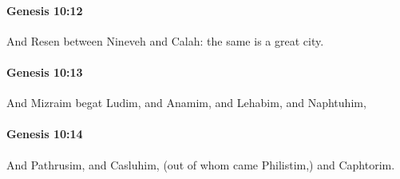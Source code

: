 		\paragraph{Genesis 10:12} %
			\label{GENESIS-10-12}

			And Resen between Nineveh and Calah: the same is a great city.


		\paragraph{Genesis 10:13} %
			\label{GENESIS-10-13}

			And Mizraim begat Ludim, and Anamim, and Lehabim, and Naphtuhim,


		\paragraph{Genesis 10:14} %
			\label{GENESIS-10-14}

			And Pathrusim, and Casluhim, (out of whom came Philistim,) and Caphtorim.


